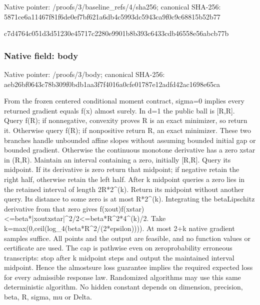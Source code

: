 \documentclass[10pt,a4paper]{article}
\begin{document}
Native pointer: /proofs/3/baseline\_refs/4/sha256; canonical SHA-256: 5871ce6a11467f81f6de0ef7\allowbreak{}bf621a6db4c5993dc5943ca9\allowbreak{}f0c9c68815b52b77


c7d4764c051d3d51230e4571\allowbreak{}7c2280e9901b8b393c6433cd\allowbreak{}b46558e56abcb77b


\subsubsection{Native field: body}


Native pointer: /proofs/3/body; canonical SHA-256: aeb26bf0643c78b309f0bdb1\allowbreak{}aa3f7f4016a0cfe01787e12a\allowbreak{}dfd42ac1698e65ca


From the frozen centered conditional moment contract, sigma=0 implies every returned gradient equals f(x) almost surely. In d=1 the public ball is [R,R]. Query f(R); if nonnegative, convexity proves R is an exact minimizer, so return it. Otherwise query f(R); if nonpositive return R, an exact minimizer. These two branches handle unbounded affine slopes without assuming bounded initial gap or bounded gradient. Otherwise the continuous monotone derivative has a zero xstar in (R,R). Maintain an interval containing a zero, initially [R,R]. Query its midpoint. If its derivative is zero return that midpoint; if negative retain the right half, otherwise retain the left half. After k midpoint queries a zero lies in the retained interval of length 2R*2\textasciicircum{}(k). Return its midpoint without another query. Its distance to some zero is at most R*2\textasciicircum{}(k). Integrating the betaLipschitz derivative from that zero gives f(xout)f(xstar)<=beta*|\allowbreak{}xoutxstar|\textasciicircum{}2/2<=beta*R\textasciicircum{}\allowbreak{}2*4\textasciicircum{}(k)/2. Take k=max(0,ceil(log\_4(beta*\allowbreak{}R\textasciicircum{}2/(2*epsilon)))). At most 2+k native gradient samples suffice. All points and the output are feasible, and no function values or certificate are used. The cap is pathwise even on zeroprobability erroneous transcripts: stop after k midpoint steps and output the maintained interval midpoint. Hence the almostsure loss guarantee implies the required expected loss for every admissible response law. Randomized algorithms may use this same deterministic algorithm. No hidden constant depends on dimension, precision, beta, R, sigma, mu or Delta.
\end{document}

